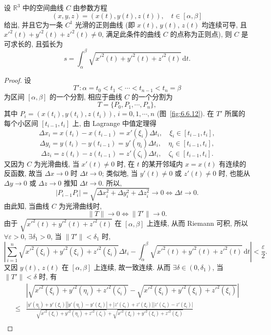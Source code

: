 \begin{theorem}[可求长的充分条件]\label{thm:6.6.1}
设 $\mathbb{R}^{3}$ 中的空间曲线 $C$ 由参数方程
\[
(x,y,z)=(x(t),y(t),z(t)),\quad t\in[\alpha,\beta]
\]
给出, 并且它为一条 $C^{1}$ 光滑的正则曲线 (即 $x(t)$, $y(t)$, $z(t)$ 均连续可导, 且 $x'^{2}(t)+y'^{2}(t)+z'^{2}(t)\neq0$, 满足此条件的曲线 $C$ 的点称为正则点), 则 $C$ 是可求长的, 且弧长为
\[
s=\int_{\alpha}^{\beta}\sqrt{x'^{2}(t)+y'^{2}(t)+z'^{2}(t)}\,\mathrm{d}t.
\]
\end{theorem}

\begin{proof}
设
\[
T':\alpha=t_{0}<t_{1}<\cdots<t_{n-1}<t_{n}=\beta
\]
为区间 $[\alpha,\beta]$ 的一个分割, 相应于曲线 $C$ 的一个分割为
\[
T=\{P_{0},P_{1},\cdots,P_{n}\},
\]
其中 $P_{i}=(x(t_{i}),y(t_{i}),z(t_{i}))$, $i=0,1,\cdots,n$ (图~\ref{fig:6.6.12}). 在 $T'$ 所属的每个小区间 $[t_{i-1},t_{i}]$ 上, 由 Lagrange 中值定理得
\[
\Delta x_{i}=x(t_{i})-x(t_{i-1})=x'(\xi_{i})\Delta t_{i},\quad\xi_{i}\in[t_{i-1},t_{i}],
\]
\[
\Delta y_{i}=y(t_{i})-y(t_{i-1})=y'(\eta_{i})\Delta t_{i},\quad\eta_{i}\in[t_{i-1},t_{i}],
\]
\[
\Delta z_{i}=z(t_{i})-z(t_{i-1})=z'(\zeta_{i})\Delta t_{i},\quad\zeta_{i}\in[t_{i-1},t_{i}].
\]
又因为 $C$ 为光滑曲线, 当 $x'(t)\neq0$ 时, 在 $t$ 的某开邻域内 $x=x(t)$ 有连续的反函数, 故当 $\Delta x\to0$ 时 $\Delta t\to0$; 类似地, 当 $y'(t)\neq0$ 或 $z'(t)\neq0$ 时, 也能从 $\Delta y\to0$ 或 $\Delta z\to0$ 推知 $\Delta t\to0$. 所以,
\[
|P_{i-1}P_{i}|=\sqrt{\Delta x_{i}^{2}+\Delta y_{i}^{2}+\Delta z_{i}^{2}}\to0\Longleftrightarrow\Delta t\to0.
\]
由此知, 当曲线 $C$ 为光滑曲线时,
\[
\|T\|\to0\Longleftrightarrow\|T'\|\to0.
\]
由于 $\sqrt{x'^{2}(t)+y'^{2}(t)+z'^{2}(t)}$ 在 $[\alpha,\beta]$ 上连续, 从而 Riemann 可积, 所以 $\forall\varepsilon>0$, $\exists\delta_{1}>0$, 当 $\|T'\|<\delta_{1}$ 时,
\[
\left|\sum_{i=1}^{n}\sqrt{x'^{2}(\xi_{i})+y'^{2}(\xi_{i})+z'^{2}(\xi_{i})}\Delta t_{i}-\int_{\alpha}^{\beta}\sqrt{x'^{2}(t)+y'^{2}(t)+z'^{2}(t)}\,\mathrm{d}t\right|<\frac{\varepsilon}{2}.
\]
又因 $y(t)$, $z(t)$ 在 $[\alpha,\beta]$ 上连续, 故一致连续. 从而 $\exists\delta\in(0,\delta_{1})$, 当 $\|T'\|<\delta$ 时, 有
\[
\begin{aligned}
&\left|\sqrt{x'^{2}(\xi_{i})+y'^{2}(\eta_{i})+z'^{2}(\zeta_{i})}-\sqrt{x'^{2}(\xi_{i})+y'^{2}(\xi_{i})+z'^{2}(\xi_{i})}\right|\\
\leqslant&\frac{|y'(\eta_{i})+y'(\xi_{i})||y'(\eta_{i})-y'(\xi_{i})|+|z'(\zeta_{i})+z'(\xi_{i})||z'(\zeta_{i})-z'(\xi_{i})|}{\sqrt{x'^{2}(\xi_{i})+y'^{2}(\eta_{i})+z'^{2}(\zeta_{i})}+\sqrt{x'^{2}(\xi_{i})+y'^{2}(\xi_{i})+z'^{2}(\xi_{i})}}\\

\end{aligned}\]
\end{proof}

